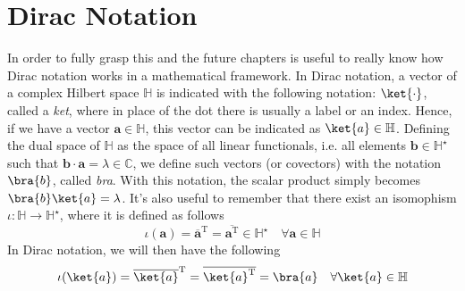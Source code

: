 \documentclass[a4paper, 11pt]{book}
\renewcommand{\vec}[1]{\mathbf{#1}}
\newcommand{\1}{\opr{\mathds{1}}}
\theoremstyle{plain}
\begin{document}
	\section{Dirac Notation}
	In order to fully grasp this and the future chapters is useful to really know how Dirac notation works in a mathematical framework. In Dirac notation, a vector of a complex Hilbert space $\mathbb{H}$ is indicated with the following notation: $\ket{\cdot}$, called a \textit{ket}, where in place of the dot there is usually a label or an index. Hence, if we have a vector $\vec{a}\in\mathbb{H}$, this vector can be indicated as $\ket{a}\in\mathbb{H}$. Defining the dual space of $\mathbb{H}$ as the space of all linear functionals, i.e. all elements $\vec{b}\in\mathbb{H^{\star}}$ such that $\vec{b}\cdot\vec{a}=\lambda\in\mathbb{C}$, we define such vectors (or covectors) with the notation $\bra{b}$, called \textit{bra}. With this notation, the scalar product simply becomes $\bra{b}\ket{a}=\lambda$. It's also useful to remember that there exist an isomophism $\iota:\mathbb{H}\to\mathbb{H^{\star}}$, where it is defined as follows
	\begin{equation*}
		\iota(\vec{a})=\overline{\vec{a}}^{\text{T}}=\overline{\vec{a}^{\text{T}}}\in\mathbb{H^{\star}}\quad\forall\vec{a}\in\mathbb{H}
	\end{equation*}
	In Dirac notation, we will then have the following
	\begin{equation*}
		\iota(\ket{a})=\overline{\ket{a}}^{\text{T}}=\overline{\ket{a}^{\text{T}}}=\bra{a}\quad\forall\ket{a}\in\mathbb{H}
	\end{equation*}
\end{document}
